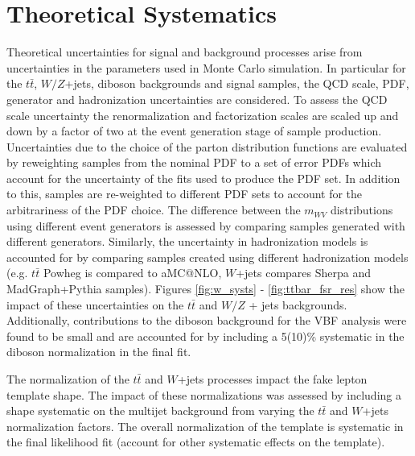 \section{Theoretical Systematics}
Theoretical uncertainties for signal and background processes arise from uncertainties in the parameters used in Monte Carlo simulation. In particular for the $t\bar{t}$, $W/Z$+jets, diboson backgrounds and signal samples, the QCD scale, PDF, generator and hadronization uncertainties are considered. To assess the QCD scale uncertainty the renormalization and factorization scales are scaled up and down by a factor of two at the event generation stage of sample production. Uncertainties due to the choice of the parton distribution functions are evaluated by reweighting samples from the nominal PDF to a set of error PDFs which account for the uncertainty of the fits used to produce the PDF set. In addition to this, samples are re-weighted to different PDF sets to account for the arbitrariness of the PDF choice. The difference between the $m_{WV}$ distributions using different event generators is assessed by comparing samples generated with different generators. Similarly, the uncertainty in hadronization models is accounted for by comparing samples created using different hadronization models (e.g. $t\bar{t}$ Powheg is compared to aMC@NLO, $W$+jets compares Sherpa and MadGraph+Pythia samples). Figures \ref{fig:w_systs} - \ref{fig:ttbar_fsr_res} show the impact of these uncertainties on the $t\bar{t}$ and $W/Z$ + jets backgrounds. Additionally, contributions to the diboson background for the VBF analysis were found to be small and are accounted for by including a 5(10)\% systematic in the diboson normalization in the final fit.

The normalization of the $t\bar{t}$ and $W$+jets processes impact the fake lepton template shape. The impact of these normalizations was assessed by including a shape systematic on the multijet background from varying the $t\bar{t}$ and $W$+jets normalization factors. The overall normalization of the template is systematic in the final likelihood fit (account for other systematic effects on the template).



